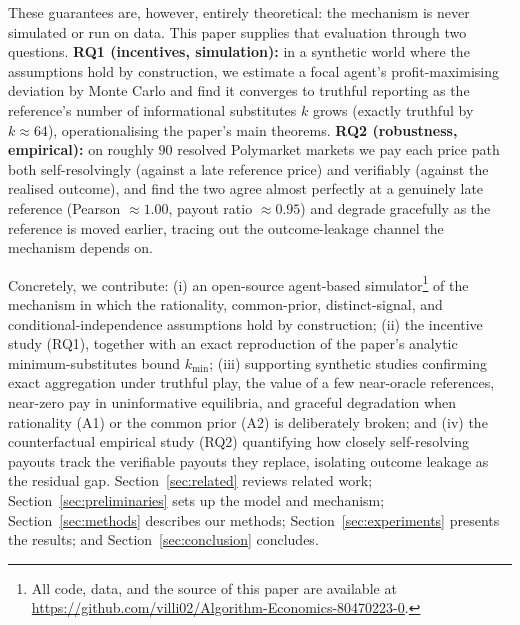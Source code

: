 These guarantees are, however, entirely theoretical: the mechanism is never simulated or
run on data. This paper supplies that evaluation through two questions. \textbf{RQ1
(incentives, simulation):} in a synthetic world where the assumptions hold by
construction, we estimate a focal agent's profit-maximising deviation by Monte Carlo and
find it converges to truthful reporting as the reference's number of informational
substitutes $k$ grows (exactly truthful by $k\approx 64$), operationalising the
paper's main theorems. \textbf{RQ2 (robustness, empirical):} on roughly $90$ resolved
Polymarket markets we pay each price path both self-resolvingly (against a late reference
price) and verifiably (against the realised outcome), and find the two agree almost
perfectly at a genuinely late reference (Pearson $\approx 1.00$, payout ratio
$\approx 0.95$) and degrade gracefully as the reference is moved earlier, tracing out
the outcome-leakage channel the mechanism depends on.

Concretely, we contribute: (i) an open-source agent-based
simulator\footnote{All code, data, and the source of this paper are available at
\url{https://github.com/villi02/Algorithm-Economics-80470223-0}.} of the mechanism in
which the rationality, common-prior, distinct-signal, and conditional-independence
assumptions hold by construction; (ii) the incentive study (RQ1), together with an exact
reproduction of the paper's analytic minimum-substitutes bound $k_{\min}$; (iii)
supporting synthetic studies confirming exact aggregation under truthful play, the value
of a few near-oracle references, near-zero pay in uninformative equilibria, and graceful
degradation when rationality (A1) or the common prior (A2) is deliberately broken; and (iv)
the counterfactual empirical study (RQ2) quantifying how closely self-resolving payouts
track the verifiable payouts they replace, isolating outcome leakage as the residual gap.
Section~\ref{sec:related} reviews related work; Section~\ref{sec:preliminaries} sets up
the model and mechanism; Section~\ref{sec:methods} describes our methods;
Section~\ref{sec:experiments} presents the results; and Section~\ref{sec:conclusion}
concludes.

